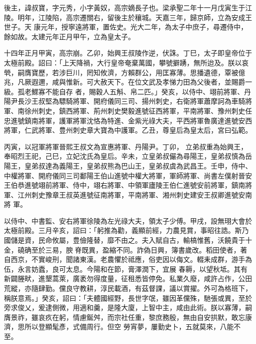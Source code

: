 
\begin{pinyinscope}

 後主，諱叔寶，字元秀，小字黃奴，高宗嫡長子也。梁承聖二年十一月戊寅生于江陵。明年，江陵陷，高宗遷關右，留後主於穰城。天嘉三年，歸京師，立為安成王世子。天
 康元年，授寧遠將軍，置佐史。光大二年，為太子中庶子，尋遷侍中，餘如故。太建元年正月甲午，立為皇太子。



 十四年正月甲寅，高宗崩。乙卯，始興王叔陵作逆，伏誅。丁巳，太子即皇帝位于太極前殿。詔曰：「上天降禍，大行皇帝奄棄萬國，攀號擗踴，無所迨及。朕以哀煢，嗣膺寶歷，若涉巨川，罔知攸濟，方賴群公，用匡寡薄。思播遺德，覃被億兆，凡厥遐邇，咸與惟新。可大赦天下。在位文武及孝悌力田為父後者，並賜爵一級。孤老鰥寡不能自存
 者，賜穀人五斛、帛二匹。」癸亥，以侍中、翊前將軍、丹陽尹長沙王叔堅為驃騎將軍、開府儀同三司、揚州刺史，右衛將軍蕭摩訶為車騎將軍、南徐州刺史，鎮西將軍、荊州刺史樊毅進號征西將軍，平南將軍、豫州刺史任忠進號鎮南將軍，護軍將軍沈恪為特進、金紫光祿大夫，平西將軍魯廣達進號安西將軍，仁武將軍、豊州刺史章大寶為中護軍。乙丑，尊皇后為皇太后，宮曰弘範。



 丙寅，以冠軍將軍晉熙王叔文為宣惠將軍、丹陽尹。丁卯，
 立弟叔重為始興王，奉昭烈王祀，己巳，立妃沈氏為皇后。辛未，立皇弟叔儼為尋陽王，皇弟叔慎為岳陽王，皇弟叔達為義陽王，皇弟叔熊為巴山王，皇弟叔虞為武昌王。壬申，侍中、中權將軍、開府儀同三司鄱陽王伯山進號中權大將軍，軍師將軍、尚書左僕射晉安王伯恭進號翊前將軍、侍中，翊右將軍、中領軍廬陵王伯仁進號安前將軍，鎮南將軍、江州刺史豫章王叔英進號征南將軍，平南將軍、湘州刺史建安王叔卿進號安南將
 軍。



 以侍中、中書監、安右將軍徐陵為左光祿大夫，領太子少傅。甲戌，設無珝大會於太極前殿。三月辛亥，詔曰：「躬推為勸，義顯前經，力農見賞，事昭往誥。斯乃國儲是資，民命攸屬，豊儉隆替，靡不由之。夫入賦自古，輸槁惟舊，沃饒貴于十金，磽确至於三易，腴脊既異，盈縮不同。詐偽日興，簿書歲改。稻田使者，著自西京，不實峻刑，聞諸東漢。老農懼於祗應，俗吏因以侮文。輟耒成群，游手為伍，永言妨蠹，良可太息。今陽和在節，膏澤潤下，宜展
 春耨，以望秋坻。其有新闢塍畎，進墾蒿萊，廣袤勿得度量，征租悉皆停免。私業久廢，咸許占作，公田荒縱，亦隨肆勤。儻良守教耕，淳民載酒，有茲督課，議以賞擢。外可為格班下，稱朕意焉。」癸亥，詔曰：「夫體國經野，長世字氓，雖因革儻殊，馳張或異，至於旁求俊乂，爰逮側微，用適和羹，是隆大廈，上智中主，咸由此術。朕以寡薄，嗣膺景祚，雖哀疚在躬，情慮鋋舛，而宗社任重，黎庶務殷，無由自安拱默，敢忘康濟，思所以登顯髦彥，式備周行。但空
 勞宵夢，屢勤史卜，五就莫來，八能不至。




\end{pinyinscope}
